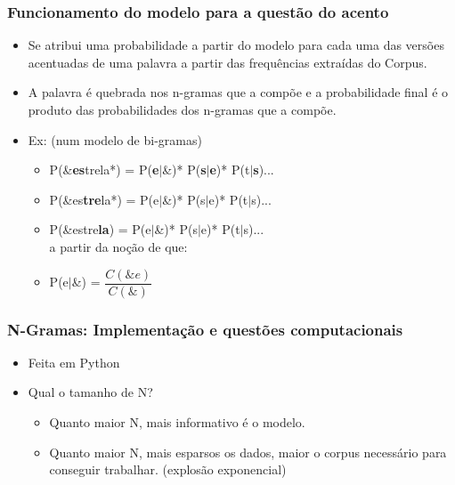 \documentclass[xcolor=table]{beamer}
\begin{document}
\begin{frame}
	\frametitle{Funcionamento do modelo para a questão do acento}
	\begin{itemize}
		\item Se atribui uma probabilidade a partir do modelo para cada uma das versões acentuadas de uma palavra a partir das frequências extraídas do Corpus.\\
		\item A palavra é quebrada nos n-gramas que a compõe e a probabilidade final é o produto das probabilidades dos n-gramas que a compõe.\\
		\item Ex: (num modelo de bi-gramas)
			\begin{itemize}
				\item P(\&\textbf{es}trela*) = P(\textbf{e}$\mid$\&)* P(\textbf{s}$\mid$\textbf{e})* P(t$\mid$\textbf{s})...\\
				\item P(\&es\textbf{tre}la*) = P(e$\mid$\&)* P(s$\mid$e)* P(t$\mid$s)...\\
				\item P(\&estre\textbf{la}) = P(e$\mid$\&)* P(s$\mid$e)* P(t$\mid$s)...\\
				a partir da noção de que:\\
				\item P(e$\mid$\&) = $\dfrac{C(\&e)}{C(\&)}$
				
				
				
			\end{itemize}
	\end{itemize}
\end{frame}
\begin{frame}
	\frametitle{N-Gramas: Implementação e questões computacionais}
	\begin{itemize}
		\item Feita em Python\\
		\item Qual o tamanho de N?\\
		\begin{itemize}
			\item Quanto maior N, mais informativo é o modelo.\\
			\item Quanto maior N, mais esparsos os dados, maior o corpus necessário para conseguir trabalhar. (explosão exponencial)\\
		\end{itemize}
	\end{itemize}
	
\end{frame}
\end{document}
